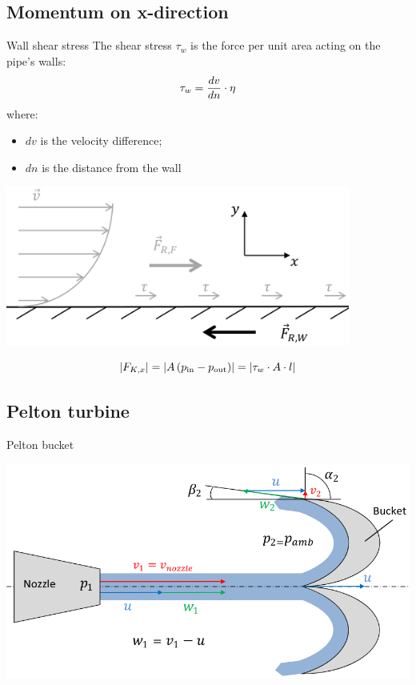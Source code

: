 \documentclass{article}
\begin{document}
\begin{multicols}{2}
\subsection{Momentum on x-direction}
\begin{theorybox}{Wall shear stress}
    The shear stress $\tau_w$ is the force per unit area acting on the
    pipe's walls:
    \begin{equation}
        \tau_w = \frac{dv}{dn}\cdot \eta
        \vspace*{-0.3cm}
    \end{equation}
    where:
    \begin{itemize}
        \item $dv$ is the velocity difference;
        \item $dn$ is the distance from the wall
    \end{itemize}
    \begin{center}
        \includegraphics[width=0.85\textwidth]{media/Wandreibung.png}
    \end{center}
    \begin{equation}
        \left|F_{K,x}\right| = \left|A\left(p_{\rm in} - p_{\rm out}\right)\right| = \left|\tau_w \cdot A \cdot l\right|
    \end{equation}
\end{theorybox}

\subsection{Pelton turbine}
\begin{theorybox}{Pelton bucket}
    \begin{center}
        \includegraphics[width=.85\textwidth]{media/pelton.png}
    \end{center}

\end{theorybox}
\end{multicols}
\end{document}

